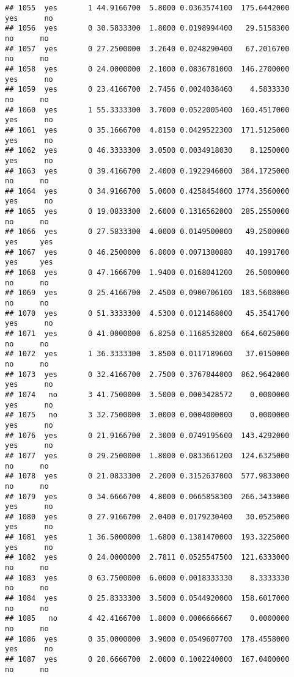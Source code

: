 \documentclass[]{article}
\begin{document}
\begin{verbatim}
## 1055  yes       1 44.9166700  5.8000 0.0363574100  175.6442000   yes      no
## 1056  yes       0 30.5833300  1.8000 0.0198994400   29.5158300    no      no
## 1057  yes       0 27.2500000  3.2640 0.0248290400   67.2016700    no      no
## 1058  yes       0 24.0000000  2.1000 0.0836781000  146.2700000   yes      no
## 1059  yes       0 23.4166700  2.7456 0.0024038460    4.5833330    no      no
## 1060  yes       1 55.3333300  3.7000 0.0522005400  160.4517000   yes      no
## 1061  yes       0 35.1666700  4.8150 0.0429522300  171.5125000   yes      no
## 1062  yes       0 46.3333300  3.0500 0.0034918030    8.1250000   yes      no
## 1063  yes       0 39.4166700  2.4000 0.1922946000  384.1725000    no      no
## 1064  yes       0 34.9166700  5.0000 0.4258454000 1774.3560000   yes      no
## 1065  yes       0 19.0833300  2.6000 0.1316562000  285.2550000    no      no
## 1066  yes       0 27.5833300  4.0000 0.0149500000   49.2500000   yes     yes
## 1067  yes       0 46.2500000  6.8000 0.0071380880   40.1991700   yes     yes
## 1068  yes       0 47.1666700  1.9400 0.0168041200   26.5000000    no      no
## 1069  yes       0 25.4166700  2.4500 0.0900706100  183.5608000    no      no
## 1070  yes       0 51.3333300  4.5300 0.0121468000   45.3541700   yes      no
## 1071  yes       0 41.0000000  6.8250 0.1168532000  664.6025000    no      no
## 1072  yes       1 36.3333300  3.8500 0.0117189600   37.0150000    no      no
## 1073  yes       0 32.4166700  2.7500 0.3767844000  862.9642000   yes      no
## 1074   no       3 41.7500000  3.5000 0.0003428572    0.0000000   yes      no
## 1075   no       3 32.7500000  3.0000 0.0004000000    0.0000000   yes      no
## 1076  yes       0 21.9166700  2.3000 0.0749195600  143.4292000   yes      no
## 1077  yes       0 29.2500000  1.8000 0.0833661200  124.6325000    no      no
## 1078  yes       0 21.0833300  2.2000 0.3152637000  577.9833000    no      no
## 1079  yes       0 34.6666700  4.8000 0.0665858300  266.3433000   yes      no
## 1080  yes       0 27.9166700  2.0400 0.0179230400   30.0525000   yes      no
## 1081  yes       1 36.5000000  1.6800 0.1381470000  193.3225000   yes      no
## 1082  yes       0 24.0000000  2.7811 0.0525547500  121.6333000    no      no
## 1083  yes       0 63.7500000  6.0000 0.0018333330    8.3333330    no      no
## 1084  yes       0 25.8333300  3.5000 0.0544920000  158.6017000    no      no
## 1085   no       4 42.4166700  1.8000 0.0006666667    0.0000000    no      no
## 1086  yes       0 35.0000000  3.9000 0.0549607700  178.4558000   yes      no
## 1087  yes       0 20.6666700  2.0000 0.1002240000  167.0400000    no      no

\end{verbatim}
\end{document}
